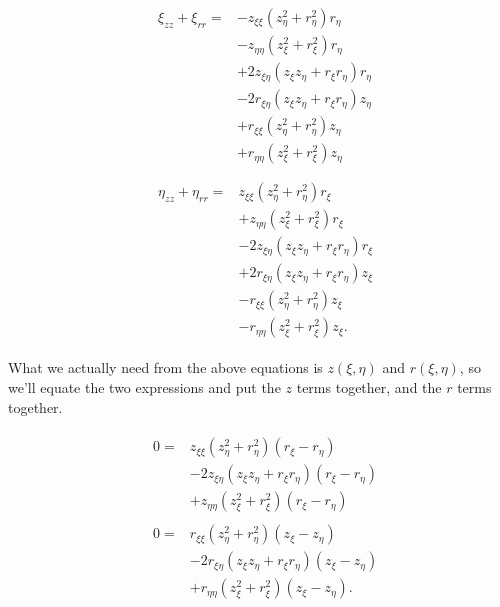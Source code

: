 \begin{subequations}
\begin{align}
	&\begin{split}
		\xi_{zz} + \xi_{rr} =&- z_{\xi\xi} ( z_\eta^2 + r_\eta^2)  r_\eta\\
		&- z_{\eta\eta} (z_\xi^2 + r_\xi^2)  r_\eta  \\
		&+ 2z_{\xi\eta} (z_\xi z_\eta + r_\xi r_\eta)  r_\eta   \\
		&- 2r_{\xi\eta} (z_\xi z_\eta + r_\xi  r_\eta)  z_\eta \\
		&+ r_{\xi\xi} ( z_\eta^2 + r_\eta^2)  z_\eta \\
		&+ r_{\eta\eta} (  z_\xi^2  + r_\xi^2) z_\eta  \\
	\end{split} \\[1em]
	&\begin{split}
		\eta_{zz} + \eta_{rr} =& z_{\xi\xi} (z_\eta^2 +  r_\eta^2)  r_\xi \\
		&+ z_{\eta\eta} (z_\xi^2 + r_\xi^2 )  r_\xi \\
		&- 2z_{\xi\eta} (z_\xi z_\eta + r_\xi r_\eta ) r_\xi  \\
		&+ 2 r_{\xi\eta} ( z_\xi z_\eta +  r_\xi  r_\eta)  z_\xi \\
		&- r_{\xi\xi} ( z_\eta^2 + r_\eta^2 ) z_\xi \\
		&- r_{\eta\eta} (z_\xi^2 + r_\xi^2 ) z_\xi.
	\end{split}
\end{align}
\end{subequations}


\noindent What we actually need from the above equations is \(z(\xi,\eta)\) and \(r(\xi,\eta)\), so we'll equate the two expressions and put the \(z\) terms together, and the \(r\) terms together.

\begin{subequations}
\begin{align}
	&\begin{split}
		0=& z_{\xi\xi} ( z_\eta^2 + r_\eta^2) (r_\xi - r_\eta)\\
		&- 2z_{\xi\eta} (z_\xi z_\eta + r_\xi r_\eta)  (r_\xi - r_\eta)   \\
		&+ z_{\eta\eta} (z_\xi^2 + r_\xi^2)  (r_\xi - r_\eta)
	\end{split} \\[1em]
	&\begin{split}
		0=& r_{\xi\xi} ( z_\eta^2 + r_\eta^2 )  (z_\xi - z_\eta) \\
		&- 2r_{\xi\eta} (z_\xi z_\eta + r_\xi  r_\eta) (z_\xi - z_\eta) \\
		&+ r_{\eta\eta} (z_\xi^2 + r_\xi^2 )  (z_\xi - z_\eta).
	\end{split}
\end{align}
\end{subequations}


